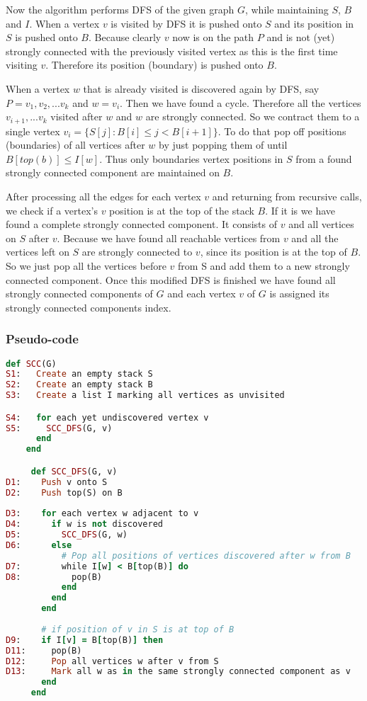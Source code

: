 \documentclass{report}
\theoremstyle{plain}
\theoremstyle{definition}
\theoremstyle{remark}
\numberwithin{definition}{chapter}
\numberwithin{example}{chapter}
\numberwithin{figure}{chapter}
\numberwithin{theorem}{chapter}
\numberwithin{lemma}{chapter}
\begin{document}
Now the algorithm performs DFS of the given graph $G$, while maintaining $S$, $B$ and $I$. When a vertex $v$ is visited by DFS it is pushed onto $S$ and its position in $S$ is pushed onto $B$. Because clearly $v$ now is on the path $P$ and is not (yet) strongly connected with the previously visited vertex as this is the first time visiting $v$. Therefore its position (boundary) is pushed onto $B$.

When a vertex $w$ that is already visited is discovered again by DFS, say $P=v_1,v_2,...v_k$ and $w=v_i$. Then we have found a cycle. Therefore all the vertices $v_{i+1},...v_k$ visited after $w$ and $w$ are strongly connected. So we contract them to a single vertex $v_i=\{ S[j] : B[i] \leq j < B[i+1] \}$. To do that pop off positions (boundaries) of all vertices after $w$ by just popping them of until $B[top(b)] \leq I[w]$. Thus only boundaries vertex positions in $S$ from a found strongly connected component are maintained on $B$.

After processing all the edges for each vertex $v$ and returning from recursive calls, we check if a vertex's $v$ position is at the top of the stack $B$. If it is we have found a complete strongly connected component. It consists of $v$ and all vertices on $S$ after $v$. Because we have found all reachable vertices from $v$ and all the vertices left on $S$ are strongly connected to $v$, since its position is at the top of $B$. So we just pop all the vertices before $v$ from S and add them to a new strongly connected component. Once this modified DFS is finished we have found all strongly connected components of $G$ and each vertex $v$ of $G$ is assigned its strongly connected components index.

\subsubsection*{Pseudo-code}

\begin{lstlisting}[language=Ruby]
    def SCC(G)
S1:   Create an empty stack S
S2:   Create an empty stack B
S3:   Create a list I marking all vertices as unvisited

S4:   for each yet undiscovered vertex v
S5:     SCC_DFS(G, v)
      end
    end

     def SCC_DFS(G, v)  
D1:    Push v onto S
D2:    Push top(S) on B
  
D3:    for each vertex w adjacent to v
D4:      if w is not discovered
D5:        SCC_DFS(G, w)
D6:      else
           # Pop all positions of vertices discovered after w from B
D7:        while I[w] < B[top(B)] do
D8:          pop(B)
           end
         end
       end
  
       # if position of v in S is at top of B
D9:    if I[v] = B[top(B)] then
D11:     pop(B)
D12:     Pop all vertices w after v from S
D13:     Mark all w as in the same strongly connected component as v
       end
     end
\end{lstlisting}
\end{document}
